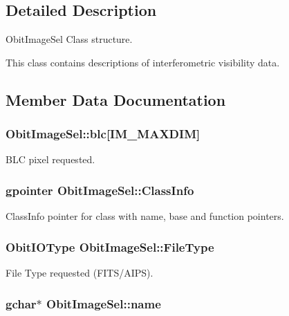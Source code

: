 \subsection{Detailed Description}
Obit\-Image\-Sel Class structure. 

This class contains descriptions of interferometric visibility data. 



\subsection{Member Data Documentation}
\subsubsection{ {\bf Obit\-Image\-Sel::blc}[IM\_\-MAXDIM]}\label{structObitImageSel_o5}


BLC pixel requested. 

\subsubsection{\setlength{\rightskip}{0pt plus 5cm}gpointer {\bf Obit\-Image\-Sel::Class\-Info}}\label{structObitImageSel_o1}


Class\-Info pointer for class with name, base and function pointers. 

\subsubsection{\setlength{\rightskip}{0pt plus 5cm}Obit\-IOType {\bf Obit\-Image\-Sel::File\-Type}}\label{structObitImageSel_o4}


File Type requested (FITS/AIPS). 

\subsubsection{\setlength{\rightskip}{0pt plus 5cm}gchar$\ast$ {\bf Obit\-Image\-Sel::name}}\label{structObitImageSel_o3}



